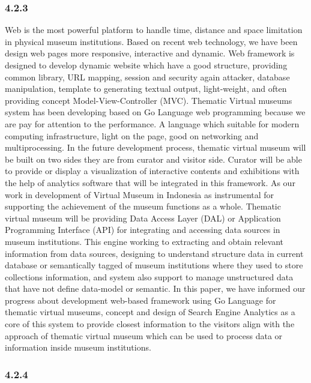\subsubsection{4.2.3}

Web is the most powerful platform to handle time, distance and space limitation in physical museum institutions. Based on recent web technology, we have been design web pages more responsive, interactive and dynamic. Web framework is designed to develop dynamic website which have a good structure, providing common library, URL mapping, session and security again attacker, database manipulation, template to generating textual output, light-weight, and often providing concept Model-View-Controller (MVC). Thematic Virtual museums system has been developing based on Go Language web programming because we are pay for attention to the performance. A language which suitable for modern computing infrastructure, light on the page, good on networking and multiprocessing. In the future development process, thematic virtual museum will be built on two sides they are from curator and visitor side. Curator will be able to provide or display a visualization of interactive contents and exhibitions with the help of analytics software that will be integrated in this framework. As our work in development of Virtual Museum in Indonesia as instrumental for supporting the achievement of the museum functions as a whole. Thematic virtual museum will be providing Data Access Layer (DAL) or Application Programming Interface (API) for integrating and accessing data sources in museum institutions. This engine working to extracting and obtain relevant information from data sources, designing to understand structure data in current database or semantically tagged of museum institutions where they used to store collections information, and system also support to manage unstructured data that have not define data-model or semantic. In this paper, we have informed our progress about development web-based framework using Go Language for thematic virtual museums, concept and design of Search Engine Analytics as a core of this system to provide closest information to the visitors align with the approach of thematic virtual museum which can be used to process data or information inside museum institutions.

\subsubsection{4.2.4}

